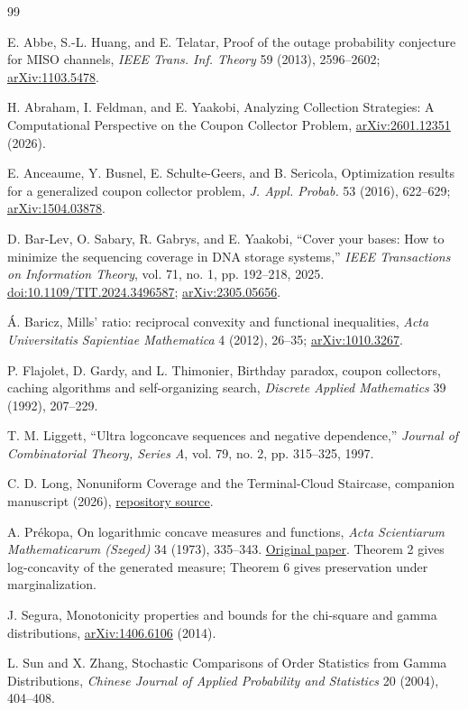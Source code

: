 \documentclass[11pt]{article}
\theoremstyle{definition}
\theoremstyle{remark}
\newcommand{\1}{\mathbf 1}
\begin{document}
\begin{thebibliography}{99}\raggedright

 E. Abbe, S.-L. Huang, and E. Telatar,
Proof of the outage probability conjecture for MISO channels,
\emph{IEEE Trans. Inf. Theory} 59 (2013), 2596--2602;
\href{https://arxiv.org/abs/1103.5478}{arXiv:1103.5478}.

 H. Abraham, I. Feldman, and E. Yaakobi,
Analyzing Collection Strategies: A Computational Perspective on the Coupon Collector Problem,
\href{https://arxiv.org/abs/2601.12351}{arXiv:2601.12351} (2026).

 E. Anceaume, Y. Busnel, E. Schulte-Geers, and B. Sericola,
Optimization results for a generalized coupon collector problem,
\emph{J. Appl. Probab.} 53 (2016), 622--629;
\href{https://arxiv.org/abs/1504.03878}{arXiv:1504.03878}.

D. Bar-Lev, O. Sabary, R. Gabrys, and E. Yaakobi,
``Cover your bases: How to minimize the sequencing coverage in DNA storage systems,''
\emph{IEEE Transactions on Information Theory}, vol. 71, no. 1, pp. 192--218, 2025.
\href{https://doi.org/10.1109/TIT.2024.3496587}{doi:10.1109/TIT.2024.3496587};
\href{https://arxiv.org/abs/2305.05656}{arXiv:2305.05656}.

 \'A. Baricz,
Mills' ratio: reciprocal convexity and functional inequalities,
\emph{Acta Universitatis Sapientiae Mathematica} 4 (2012), 26--35;
\href{https://arxiv.org/abs/1010.3267}{arXiv:1010.3267}.

 P. Flajolet, D. Gardy, and L. Thimonier,
Birthday paradox, coupon collectors, caching algorithms and self-organizing search,
\emph{Discrete Applied Mathematics} 39 (1992), 207--229.

T. M. Liggett,
``Ultra logconcave sequences and negative dependence,''
\emph{Journal of Combinatorial Theory, Series A}, vol. 79, no. 2, pp. 315--325, 1997.

 C. D. Long,
Nonuniform Coverage and the Terminal-Cloud Staircase,
companion manuscript (2026),
\href{https://github.com/long-mathematics/mds-coverage-optimization/blob/main/terminal_cloud_staircase.tex}{repository source}.

 A. Pr\'ekopa,
On logarithmic concave measures and functions,
\emph{Acta Scientiarum Mathematicarum (Szeged)} 34 (1973), 335--343.
\href{https://acta.bibl.u-szeged.hu/14411/1/math_034_335-343.pdf}{Original paper}.
Theorem 2 gives log-concavity of the generated measure;
Theorem 6 gives preservation under marginalization.

 J. Segura,
Monotonicity properties and bounds for the chi-square and gamma distributions,
\href{https://arxiv.org/abs/1406.6106}{arXiv:1406.6106} (2014).

 L. Sun and X. Zhang,
Stochastic Comparisons of Order Statistics from Gamma Distributions,
\emph{Chinese Journal of Applied Probability and Statistics} 20 (2004), 404--408.
\end{thebibliography}
\end{document}
